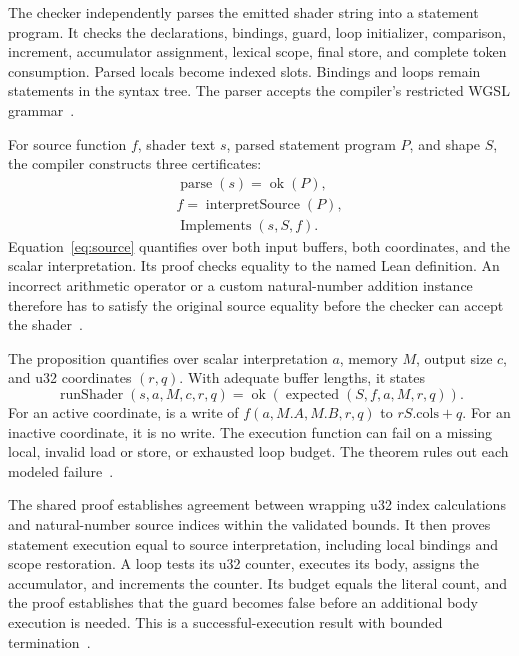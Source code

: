 The checker independently parses the emitted shader string into a statement program.  It checks the declarations, bindings, guard, loop initializer, comparison, increment, accumulator assignment, lexical scope, final store, and complete token consumption.  Parsed locals become indexed slots.  Bindings and loops remain statements in the syntax tree.  The parser accepts the compiler's restricted WGSL grammar~\cite{wg-compiler}.

For source function $f$, shader text $s$, parsed statement program $P$, and shape $S$, the compiler constructs three certificates:
\begin{gather}
\operatorname{parse}(s)=\operatorname{ok}(P),\label{eq:parse}\\
f=\operatorname{interpretSource}(P),\label{eq:source}\\
\operatorname{Implements}(s,S,f).\label{eq:implements}
\end{gather}
Equation~\eqref{eq:source} quantifies over both input buffers, both coordinates, and the scalar interpretation.  Its proof checks equality to the named Lean definition.  An incorrect arithmetic operator or a custom natural-number addition instance therefore has to satisfy the original source equality before the checker can accept the shader~\cite{wg-compiler}.

The  proposition quantifies over scalar interpretation $a$, memory $M$, output size $c$, and u32 coordinates $(r,q)$.  With adequate buffer lengths, it states
\[
\operatorname{runShader}(s,a,M,c,r,q)
=\operatorname{ok}(\operatorname{expected}(S,f,a,M,r,q)).
\]
For an active coordinate,  is a write of $f(a,M.A,M.B,r,q)$ to $rS.\mathrm{cols}+q$.  For an inactive coordinate, it is no write.  The execution function can fail on a missing local, invalid load or store, or exhausted loop budget.  The theorem rules out each modeled failure~\cite{wg-execution}.

The shared proof establishes agreement between wrapping u32 index calculations and natural-number source indices within the validated bounds.  It then proves statement execution equal to source interpretation, including local bindings and scope restoration.  A loop tests its u32 counter, executes its body, assigns the accumulator, and increments the counter.  Its budget equals the literal count, and the proof establishes that the guard becomes false before an additional body execution is needed.  This is a successful-execution result with bounded termination~\cite{wg-execution}.


